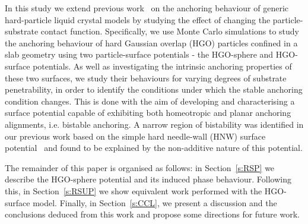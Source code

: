 \documentclass[aps,10pt,twocolumn]{revtex4}
\begin{document}
In this study we extend previous work~\cite{BarmesCleaver04a} on the anchoring behaviour of generic hard-particle
liquid crystal models by studying the effect of changing the particle-substrate contact function. Specifically, we
use Monte Carlo simulations to study the anchoring behaviour of hard Gaussian overlap (HGO) particles confined in
a slab geometry using two particle-surface potentials - the HGO-sphere and HGO-surface potentials. As well as
investigating the intrinsic anchoring properties of these two surfaces, we study their behaviours for varying
degrees of substrate penetrability, in order to identify the conditions under which the stable anchoring condition
changes. This is done with the aim of developing and characterising a surface potential capable of exhibiting both
homeotropic and planar anchoring alignments, i.e. bistable anchoring. A narrow region of bistability was
identified in our previous work based on the simple hard needle-wall (HNW) surface
potential~\cite{BarmesCleaver04a} and found to be explained by the non-additive nature of this potential.

The remainder of this paper is organised as follows: in Section~\ref{s:RSP} we describe the HGO-sphere potential
and its induced phase behaviour. Following this, in Section~\ref{s:RSUP} we show equivalent work performed with
the HGO-surface  model. Finally, in Section~\ref{s:CCL}, we present a discussion and the conclusions deduced from
this work and propose some directions for future work.


\end{document}

